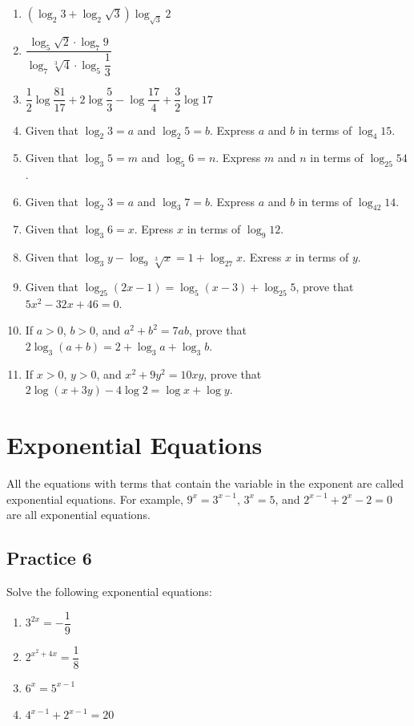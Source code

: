 \documentclass[12pt]{report}
\begin{document}
\begin{multicols}{2}
\begin{enumerate}
        \item $\left(\log_{2}3+\log_{2}{\sqrt{3}}\right)\log_{\sqrt{3}}2$
        \item $\dfrac{\log_{5}\sqrt{2}\cdot\log_{7}9}{\log_{7}\sqrt[3]{4}\cdot\log_{5}{\dfrac{1}{3}}}$
        \item ${\dfrac{1}{2}}\log{\dfrac{81}{17}}+2\log{\dfrac{5}{3}}-\log{\dfrac{17}{4}}+{\dfrac{3}{2}}\log17$
        \item Given that $\log_2 3 = a$ and $\log_2 5 = b$. Express $a$ and $b$ in terms of
              $\log_4 15$.
        \item Given that $\log_3 5 = m$ and $\log_5 6 = n$. Express $m$ and $n$ in terms of
              $\log_25 54$.
        \item Given that $\log_2 3 = a$ and $\log_3 7 = b$. Express $a$ and $b$ in terms of
              $\log_42 14$.
        \item Given that $\log_3 6 = x$. Epress $x$ in terms of $\log_9 12$.
        \item Given that $\log_3 y - \log_9 \sqrt[3]{x} = 1 + \log_27 x$. Exress $x$ in terms
              of $y$.
        \item Given that $\log_25(2x - 1) = \log_5(x-3) + \log_25 5$, prove that $5x^2 - 32x
                  + 46 = 0$.
        \item If $a > 0$, $b > 0$, and $a^2 + b^2 = 7ab$, prove that $2\log_3(a+b) = 2 +
                  \log_3 a + \log_3 b$.
        \item If $x > 0$, $y > 0$, and $x^2 + 9y^2 = 10xy$, prove that $2\log(x+3y) - 4\log2
                  = \log x + \log y$.
    \end{enumerate}
\end{multicols}

\section{Exponential Equations}

All the equations with terms that contain the variable in the exponent are
called exponential equations. For example, $9^x = 3^{x-1}$, $3^x = 5$, and
$2^{x-1} + 2^x - 2 = 0$ are all exponential equations.

\subsection*{Practice 6}

\setlength{\columnseprule}{1pt}
\setlength{\columnsep}{24pt}
\begin{multicols}{2}
    Solve the following exponential equations:
    \begin{enumerate}
        \item $3^{2x} = -\dfrac{1}{9}$
        \item $2^{x^2 + 4x} = \dfrac{1}{8}$
        \item $6^x = 5^{x-1}$
        \item $4^{x-1} + 2^{x-1} = 20$
    \end{enumerate}
\end{multicols}
\end{document}
